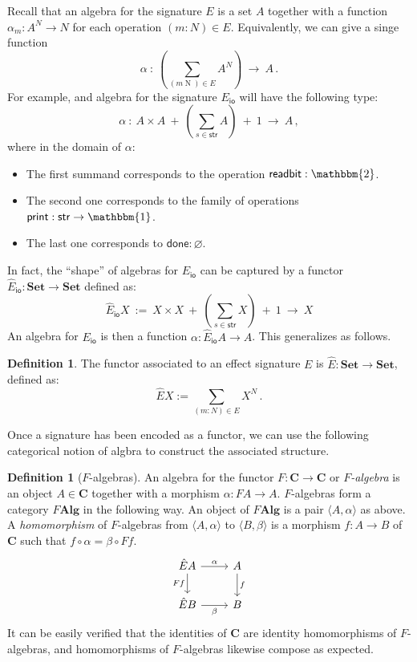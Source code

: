 \documentclass[11pt,oneside,draft]{book}
\theoremstyle{definition}
\newtheorem{definition}[theorem]{Definition}
\newcommand{\kw}[1]{\ensuremath{ \mathsf{#1} }}
\begin{document}
Recall that an algebra for the signature $E$
is a set $A$ together with a function
$\alpha_m : A^N \rightarrow N$ for each operation
$(m \mathop{:} N) \in E$.
Equivalently, we can give a singe function
\[
  \alpha \: : \:
    \left( \sum_{(m \mathop N) \in E} A^N \right)
    \: \rightarrow \: A
  \,.
\]
For example,
and algebra for the signature $E_\kw{io}$
will have the following type:
\[
  \alpha \: : \:
    A \times A \: + \:
    \left( \sum_{s \in \kw{str}} A \right) \: + \:
    1 \: \rightarrow \: A
  \,,
\]
where in the domain of $\alpha$:
\begin{itemize}
  \item
    The first summand corresponds to the operation
    $\kw{readbit} : \mathbbm{2}$.
  \item
    The second one corresponds to the family of operations
    $\kw{print} : \kw{str} \rightarrow \mathbbm{1}$.
  \item
    The last one corresponds to $\kw{done} : \varnothing$.
\end{itemize}
In fact,
the ``shape'' of algebras for $E_\kw{io}$
can be captured by a functor
$\hat{E}_\kw{io} : \mathbf{Set} \rightarrow \mathbf{Set}$
defined as:
\[
  \hat{E}_\kw{io} X \: := \:
    X \times X \: + \:
    \left( \sum_{s \in \kw{str}} X \right) \: + \:
    1 \: \rightarrow \: X
\]
An algebra for $E_\kw{io}$ is then a function
$\alpha : \hat{E}_\kw{io} A \rightarrow A$.
This generalizes as follows.

\begin{definition}
The functor associated to an effect signature $E$
is $\hat{E} : \mathbf{Set} \rightarrow \mathbf{Set}$,
defined as:
\[
    \hat{E} X := \sum_{(m : N) \in E} X^N \,.
\]
\end{definition}

Once a signature has been encoded as a functor,
we can use the following categorical notion of algbra
to construct the associated structure.

\begin{definition}[$F$-algebras]
An algebra for the functor
$F : \mathbf{C} \rightarrow \mathbf{C}$
or \emph{$F$-algebra}
is an object $A \in \mathbf{C}$
together with a morphism $\alpha : F A \rightarrow A$.
$F$-algebras form a category $F \mathbf{Alg}$
in the following way.
An object of $F \mathbf{Alg}$
is a pair $\langle A, \alpha \rangle$ as above.
A \emph{homomorphism} of $F$-algebras
from $\langle A, \alpha \rangle$ to $\langle B, \beta \rangle$
is a morphism $f : A \rightarrow B$ of $\mathbf{C}$
such that $f \circ \alpha = \beta \circ F f$.
\[
  \begin{tikzcd}
    \hat{E} A \ar[r, "\alpha"] \ar[d, "F f"'] & A \ar[d, "f"] \\
    \hat{E} B \ar[r, "\beta"']                & B
  \end{tikzcd}
\]
It can be easily verified that the identities of $\mathbf{C}$
are identity homomorphisms of $F$-algebras,
and homomorphisms of $F$-algebras likewise compose as expected.
\end{definition}
\end{document}
